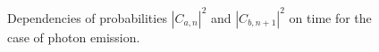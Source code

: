 \begin{figure}
\centering



\caption{Dependencies of probabilities $\left|C_{a, n}\right|^2$ and
  $\left|C_{b, n+1}\right|^2$ on time for the case of photon emission.}
\label{fig:part1:rabi}
\end{figure}
